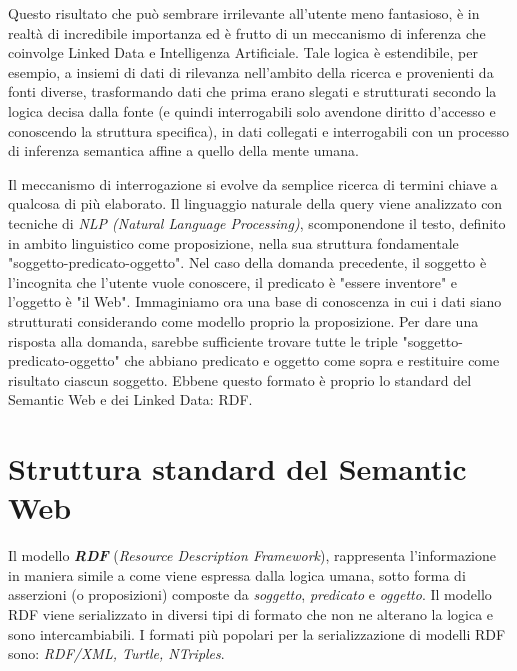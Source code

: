 Questo risultato che può sembrare irrilevante all'utente meno fantasioso, è in realtà di incredibile importanza ed è frutto di un meccanismo di inferenza che coinvolge Linked Data e Intelligenza Artificiale. Tale logica è estendibile, per esempio, a insiemi di dati di rilevanza nell'ambito della ricerca e provenienti da fonti diverse, trasformando dati che prima erano slegati e strutturati secondo la logica decisa dalla fonte (e quindi interrogabili solo avendone diritto d'accesso e conoscendo la struttura specifica), in dati collegati e interrogabili con un processo di inferenza semantica affine a quello della mente umana.

Il meccanismo di interrogazione si evolve da semplice ricerca di termini chiave a qualcosa di più elaborato. Il linguaggio naturale della query viene analizzato con tecniche di \textit{NLP (Natural Language Processing)}, scomponendone il testo, definito in ambito linguistico come proposizione, nella sua struttura fondamentale "soggetto-predicato-oggetto". Nel caso della domanda precedente, il soggetto è l'incognita che l'utente vuole conoscere, il predicato è "essere inventore" e l'oggetto è "il Web".
Immaginiamo ora una base di conoscenza in cui i dati siano strutturati considerando come modello proprio la proposizione. Per dare una risposta alla domanda, sarebbe sufficiente trovare tutte le triple "soggetto-predicato-oggetto" che abbiano predicato e oggetto come sopra e restituire come risultato ciascun soggetto. Ebbene questo formato è proprio lo standard del Semantic Web e dei Linked Data: RDF. 

\section{Struttura standard del Semantic Web}
\label{sec:intro:web_history}

Il modello \textbf{\textit{RDF}} (\textit{Resource Description Framework})\cite{rdf_overview}, rappresenta l'informazione in maniera simile a come viene espressa dalla logica umana, sotto forma di asserzioni (o proposizioni) composte da \textit{soggetto}, \textit{predicato} e \textit{oggetto}. Il modello RDF viene serializzato in diversi tipi di formato che non ne alterano la logica e sono intercambiabili. I formati più popolari per la serializzazione di modelli RDF sono: \textit{RDF/XML, Turtle, NTriples}.

